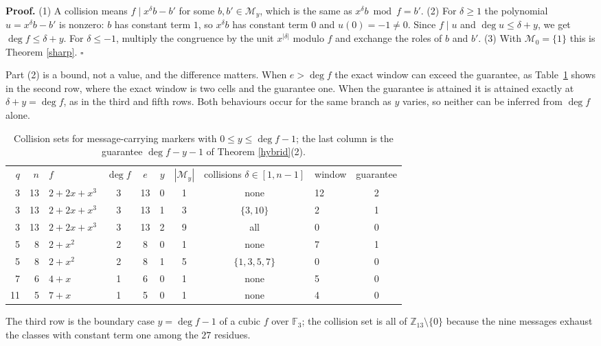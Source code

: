 \documentclass[11pt,reqno]{amsart}
\theoremstyle{definition}
\theoremstyle{remark}
\newcommand{\F}{\mathbb{F}}
\newcommand{\Z}{\mathbb{Z}}
\newcommand{\M}{\mathcal{M}}
\begin{document}
\textbf{Proof.} (1) A collision means $f\mid x^\delta b-b'$ for some $b,b'\in\M_y$, which is the same as $x^\delta b\bmod f=b'$. (2) For $\delta\ge1$ the polynomial $u=x^\delta b-b'$ is nonzero: $b$ has constant term $1$, so $x^\delta b$ has constant term $0$ and $u(0)=-1\neq0$. Since $f\mid u$ and $\deg u\le\delta+y$, we get $\deg f\le\delta+y$. For $\delta\le-1$, multiply the congruence by the unit $x^{|\delta|}$ modulo $f$ and exchange the roles of $b$ and $b'$. (3) With $\M_0=\{1\}$ this is Theorem \ref{sharp}. $\square$


Part (2) is a bound, not a value, and the difference matters. When $e>\deg f$ the exact window can exceed the guarantee, as Table~\ref{tab:hybrid} shows in the second row, where the exact window is two cells and the guarantee one. When the guarantee is attained it is attained exactly at $\delta+y=\deg f$, as in the third and fifth rows. Both behaviours occur for the same branch as $y$ varies, so neither can be inferred from $\deg f$ alone.


\begin{table}[t]
\centering
\caption{Collision sets for message-carrying markers with $0\le y\le\deg f-1$; the last column is the guarantee $\deg f-y-1$ of Theorem \ref{hybrid}(2).\label{tab:hybrid}}
\small
\begin{tabular}{rrlccccclc}
\toprule
$q$ & $n$ & $f$ & $\deg f$ & $e$ & $y$ & $|\M_y|$ & collisions $\delta\in[1,n-1]$ & window & guarantee \\
3 & 13 & $2+2x+x^3$ & 3 & 13 & 0 & 1 & none & 12 & 2 \\
3 & 13 & $2+2x+x^3$ & 3 & 13 & 1 & 3 & $\{3,10\}$ & 2 & 1 \\
3 & 13 & $2+2x+x^3$ & 3 & 13 & 2 & 9 & all & 0 & 0 \\
5 & 8 & $2+x^2$ & 2 & 8 & 0 & 1 & none & 7 & 1 \\
5 & 8 & $2+x^2$ & 2 & 8 & 1 & 5 & $\{1,3,5,7\}$ & 0 & 0 \\
7 & 6 & $4+x$ & 1 & 6 & 0 & 1 & none & 5 & 0 \\
11 & 5 & $7+x$ & 1 & 5 & 0 & 1 & none & 4 & 0 \\
\bottomrule
\end{tabular}

\smallskip
\parbox{\linewidth}{\footnotesize The third row is the boundary case $y=\deg f-1$ of a cubic $f$ over $\F_3$; the collision set is all of $\Z_{13}\setminus\{0\}$ because the nine messages exhaust the classes with constant term one among the $27$ residues.}
\end{table}
\end{document}

